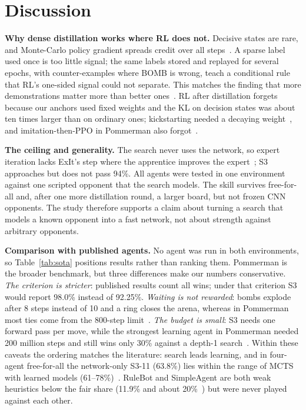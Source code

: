 \documentclass[journal]{IEEEtran}
\begin{document}
\section{Discussion}

\textbf{Why dense distillation works where RL does not.} Decisive states are rare, and Monte-Carlo policy gradient spreads credit over all steps~\cite{williams1992reinforce}. A sparse label used once is too little signal; the same labels stored and replayed for several epochs, with counter-examples where BOMB is wrong, teach a conditional rule that RL's one-sided signal could not separate. This matches the finding that more demonstrations matter more than better ones~\cite{kartal2019safer}. RL after distillation forgets because our anchors used fixed weights and the KL on decision states was about ten times larger than on ordinary ones; kickstarting needed a decaying weight~\cite{schmitt2018kickstart}, and imitation-then-PPO in Pommerman also forgot~\cite{meisheri2019}.

\textbf{The ceiling and generality.} The search never uses the network, so expert iteration lacks ExIt's step where the apprentice improves the expert~\cite{anthony2017exit}; S3 approaches but does not pass 94\%. All agents were tested in one environment against one scripted opponent that the search models. The skill survives free-for-all and, after one more distillation round, a larger board, but not frozen CNN opponents. The study therefore supports a claim about turning a search that models a known opponent into a fast network, not about strength against arbitrary opponents.

\textbf{Comparison with published agents.} No agent was run in both environments, so Table~\ref{tab:sota} positions results rather than ranking them. Pommerman is the broader benchmark, but three differences make our numbers conservative. \emph{The criterion is stricter}: published results count all wins; under that criterion S3 would report 98.0\% instead of 92.25\%. \emph{Waiting is not rewarded}: bombs explode after 8 steps instead of 10 and a ring closes the arena, whereas in Pommerman most ties come from the 800-step limit~\cite{weil2023}. \emph{The budget is small}: S3 needs one forward pass per move, while the strongest learning agent in Pommerman needed 200 million steps and still wins only 30\% against a depth-1 search~\cite{huynh2024,osogami2019}. Within these caveats the ordering matches the literature: search leads learning, and in four-agent free-for-all the network-only S3-11 (63.8\%) lies within the range of MCTS with learned models (61--78\%)~\cite{weil2023}. RuleBot and SimpleAgent are both weak heuristics below the fair share (11.9\% and about 20\%~\cite{resnick2018pommerman}) but were never played against each other.
\end{document}
